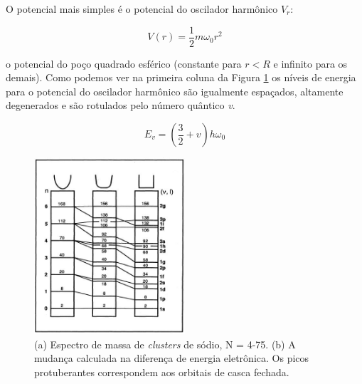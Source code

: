 O potencial mais simples é o potencial do oscilador harmônico $V_{r}$:

\begin{equation}
    V(r)= \frac{1}{2}m\omega_0r^2
\end{equation}

o potencial do poço quadrado esférico (constante para $r<R$ e infinito para os demais). Como podemos ver na primeira coluna da Figura \ref{fig:pocos} os níveis de energia para o potencial do oscilador harmônico são igualmente espaçados, altamente degenerados e são rotulados pelo número quântico \textit{v}.

\begin{equation}
    E_{v}= \left(\frac{3}{2}+v\right)h\omega_0
\end{equation}


\begin{figure}
  \centering
  \includegraphics[width=0.5\textwidth]{images/clusters/pocos}
  \caption{(a) Espectro de massa de \textit{clusters} de sódio, N = 4-75.
  (b) A mudança calculada na diferença de energia eletrônica. Os picos protuberantes correspondem aos orbitais de casca fechada.\cite{electronic_Shell_sodium}  }
  \label{fig:pocos}
\end{figure}


